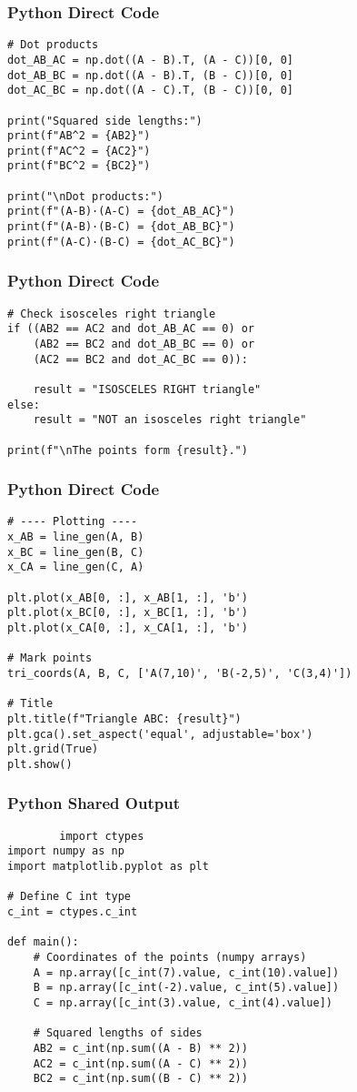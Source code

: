 \documentclass{beamer}
\begin{document}
 \begin{frame}[fragile]
		\frametitle{Python Direct Code}
		\begin{lstlisting}
# Dot products
dot_AB_AC = np.dot((A - B).T, (A - C))[0, 0]
dot_AB_BC = np.dot((A - B).T, (B - C))[0, 0]
dot_AC_BC = np.dot((A - C).T, (B - C))[0, 0]

print("Squared side lengths:")
print(f"AB^2 = {AB2}")
print(f"AC^2 = {AC2}")
print(f"BC^2 = {BC2}")

print("\nDot products:")
print(f"(A-B)·(A-C) = {dot_AB_AC}")
print(f"(A-B)·(B-C) = {dot_AB_BC}")
print(f"(A-C)·(B-C) = {dot_AC_BC}")
\end{lstlisting}
\end{frame}
 \begin{frame}[fragile]
		\frametitle{Python Direct Code}
		\begin{lstlisting}
# Check isosceles right triangle
if ((AB2 == AC2 and dot_AB_AC == 0) or
    (AB2 == BC2 and dot_AB_BC == 0) or
    (AC2 == BC2 and dot_AC_BC == 0)):
  
    result = "ISOSCELES RIGHT triangle"
else:
    result = "NOT an isosceles right triangle"

print(f"\nThe points form {result}.")
\end{lstlisting}
\end{frame}
 \begin{frame}[fragile]
		\frametitle{Python Direct Code}
		\begin{lstlisting}
# ---- Plotting ----
x_AB = line_gen(A, B)
x_BC = line_gen(B, C)
x_CA = line_gen(C, A)

plt.plot(x_AB[0, :], x_AB[1, :], 'b')
plt.plot(x_BC[0, :], x_BC[1, :], 'b')
plt.plot(x_CA[0, :], x_CA[1, :], 'b')

# Mark points
tri_coords(A, B, C, ['A(7,10)', 'B(-2,5)', 'C(3,4)'])

# Title
plt.title(f"Triangle ABC: {result}")
plt.gca().set_aspect('equal', adjustable='box')
plt.grid(True)
plt.show()
        \end{lstlisting}
\end{frame}

 \begin{frame}[fragile]
		\frametitle{Python Shared Output}
		\begin{lstlisting}
        import ctypes
import numpy as np
import matplotlib.pyplot as plt

# Define C int type
c_int = ctypes.c_int

def main():
    # Coordinates of the points (numpy arrays)
    A = np.array([c_int(7).value, c_int(10).value])
    B = np.array([c_int(-2).value, c_int(5).value])
    C = np.array([c_int(3).value, c_int(4).value])

    # Squared lengths of sides
    AB2 = c_int(np.sum((A - B) ** 2))
    AC2 = c_int(np.sum((A - C) ** 2))
    BC2 = c_int(np.sum((B - C) ** 2))
  \end{lstlisting}
\end{frame}
\end{document}
